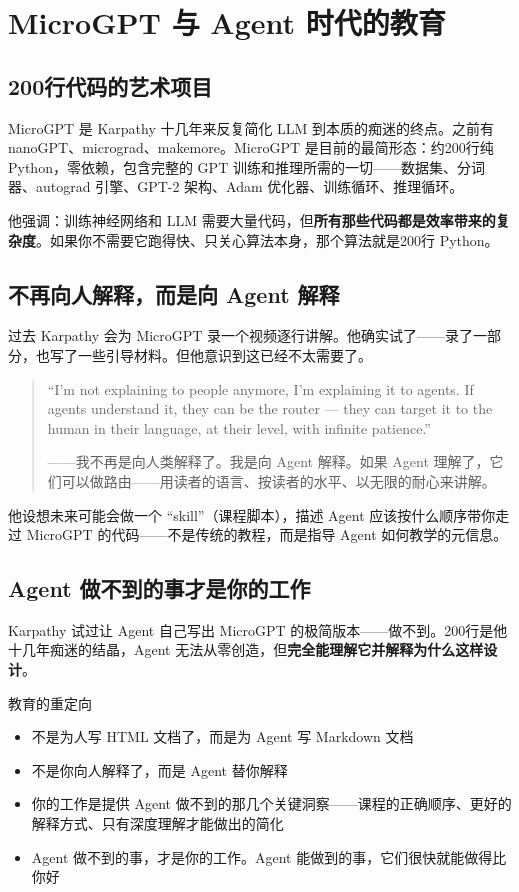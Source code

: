 \section{MicroGPT 与 Agent 时代的教育}

\subsection{200行代码的艺术项目}

MicroGPT 是 Karpathy 十几年来反复简化 LLM 到本质的痴迷的终点。之前有 nanoGPT、micrograd、makemore。MicroGPT 是目前的最简形态：约200行纯 Python，零依赖，包含完整的 GPT 训练和推理所需的一切——数据集、分词器、autograd 引擎、GPT-2 架构、Adam 优化器、训练循环、推理循环。

他强调：训练神经网络和 LLM 需要大量代码，但\textbf{所有那些代码都是效率带来的复杂度}。如果你不需要它跑得快、只关心算法本身，那个算法就是200行 Python。

\subsection{不再向人解释，而是向 Agent 解释}

过去 Karpathy 会为 MicroGPT 录一个视频逐行讲解。他确实试了——录了一部分，也写了一些引导材料。但他意识到这已经不太需要了。

\begin{quote}
``I'm not explaining to people anymore, I'm explaining it to agents. If agents understand it, they can be the router — they can target it to the human in their language, at their level, with infinite patience.''

——我不再是向人类解释了。我是向 Agent 解释。如果 Agent 理解了，它们可以做路由——用读者的语言、按读者的水平、以无限的耐心来讲解。
\end{quote}

他设想未来可能会做一个 ``skill''（课程脚本），描述 Agent 应该按什么顺序带你走过 MicroGPT 的代码——不是传统的教程，而是指导 Agent 如何教学的元信息。

\subsection{Agent 做不到的事才是你的工作}

Karpathy 试过让 Agent 自己写出 MicroGPT 的极简版本——做不到。200行是他十几年痴迷的结晶，Agent 无法从零创造，但\textbf{完全能理解它并解释为什么这样设计}。

\begin{importantbox}{教育的重定向}
\begin{itemize}
    \item 不是为人写 HTML 文档了，而是为 Agent 写 Markdown 文档
    \item 不是你向人解释了，而是 Agent 替你解释
    \item 你的工作是提供 Agent 做不到的那几个关键洞察——课程的正确顺序、更好的解释方式、只有深度理解才能做出的简化
    \item Agent 做不到的事，才是你的工作。Agent 能做到的事，它们很快就能做得比你好
\end{itemize}
\end{importantbox}

